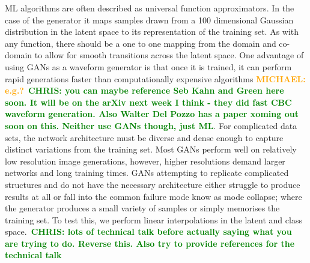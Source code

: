 \documentclass[12pt]{iopart}
\newcommand{\chris}[1]{\textbf{\textcolor{green}{CHRIS: #1}}}
\newcommand{\michael}[1]{\textbf{\textcolor{orange}{MICHAEL: #1}}}
\begin{document}
%
\ac{ML} algorithms are often described as universal function approximators. In
the case of the generator it maps samples drawn from a 100 dimensional Gaussian
distribution in the latent space to its representation of the training set. As
with any function, there should be a one to one mapping from the domain and
co-domain to allow for smooth transitions across the latent space. One
advantage of using \acp{GAN} as a waveform generator is that once it is
trained, it can perform rapid generations faster than computationally expensive
algorithms \michael{e.g.?}~\chris{you can maybe reference Seb Kahn and Green
here soon. It will be on the arXiv next week I think - they did fast CBC
waveform generation.  Also Walter Del Pozzo has a paper xoming out soon on
this. Neither use GANs though, just ML}. For complicated data sets, the network
architecture must be diverse and dense enough to capture distinct variations
from the training set.  Most GANs perform well on relatively low resolution
image generations, however, higher resolutions demand larger networks and long
training times. GANs attempting to replicate complicated structures and do not
have the necessary architecture either struggle to produce results at all or
fall into the common failure mode know as mode collapse; where the generator
produces a small variety of samples or simply memorises the training set. To
test this, we perform linear interpolations in the latent and class
space.~\chris{lots of technical talk before actually saying what you are trying
to do. Reverse this. Also try to provide references for the technical talk} 
\end{document}
